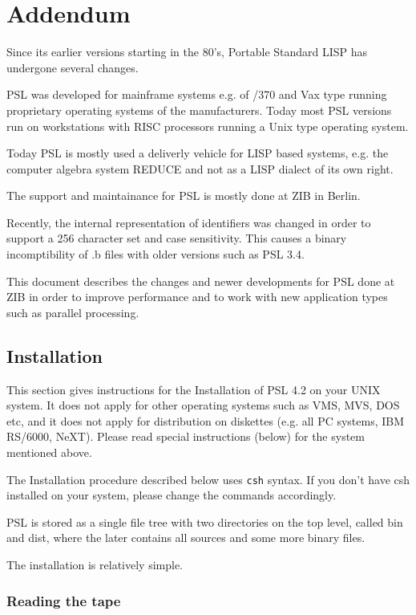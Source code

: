 \chapter*{Addendum}

Since its earlier versions starting in the 80's, Portable Standard LISP 
has undergone several changes. 

PSL was developed for mainframe systems
e.g. of /370 and Vax type running proprietary operating systems of the  
manufacturers. Today most PSL versions run on workstations with RISC processors
running a Unix type operating system. 

Today PSL is mostly used a deliverly vehicle for LISP based systems, e.g.
the computer algebra system REDUCE and not as a LISP dialect of its own 
right.

The support and maintainance for PSL is mostly done at ZIB in Berlin.

Recently, the internal representation of identifiers was changed in order
to support a 256 character set and case sensitivity. This causes a
binary incomptibility of .b files with older versions such as PSL 3.4.

This document describes the changes and newer developments for PSL
done at ZIB in order to improve performance and to work with new
application types such as parallel processing.

\section{Installation}

This section gives instructions for the Installation of PSL 4.2 on
your UNIX system. It does not apply for other operating systems such
as VMS, MVS, DOS etc, and it does not apply for distribution on
diskettes (e.g. all PC systems, IBM RS/6000, NeXT). Please read
special instructions (below) for the system mentioned above.

The Installation procedure described below uses {\tt csh} syntax.
If you don't have csh installed on your system, please change the
commands accordingly.

PSL is stored as a single file tree with two directories on the
top level, called bin and dist, where the later contains all sources
and some more binary files.

The installation is relatively simple.

\subsection{Reading the tape}

